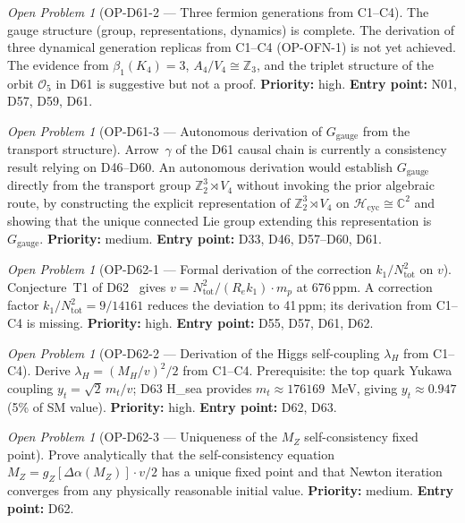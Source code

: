 \documentclass[11pt,a4paper]{article}
\theoremstyle{plain}
\theoremstyle{definition}
\theoremstyle{remark}
\newtheorem{openproblem}[theorem]{Open Problem}
\begin{document}
\begin{openproblem}[OP-D61-2 --- Three fermion generations from C1--C4]
\label{op:D61two}
The gauge structure (group, representations, dynamics) is complete. The derivation of three dynamical generation replicas from C1--C4 (OP-OFN-1) is not yet achieved. The evidence from $\beta_1(K_4) = 3$, $A_4/V_4 \cong \mathbb{Z}_3$, and the triplet structure of the orbit $\mathcal{O}_5$ in D61 is suggestive but not a proof. \textbf{Priority:} high. \textbf{Entry point:} N01, D57, D59, D61.
\end{openproblem}

\begin{openproblem}[OP-D61-3 --- Autonomous derivation of $G_\mathrm{gauge}$ from the transport structure]
\label{op:D61three}
Arrow~$\gamma$ of the D61 causal chain is currently a consistency result relying on D46--D60. An autonomous derivation would establish $G_\mathrm{gauge}$ directly from the transport group $\mathbb{Z}_2^3 \rtimes V_4$ without invoking the prior algebraic route, by constructing the explicit representation of $\mathbb{Z}_2^3 \rtimes V_4$ on $\mathcal{H}_\mathrm{cyc} \cong \mathbb{C}^2$ and showing that the unique connected Lie group extending this representation is $G_\mathrm{gauge}$. \textbf{Priority:} medium. \textbf{Entry point:} D33, D46, D57--D60, D61.
\end{openproblem}

\begin{openproblem}[OP-D62-1 --- Formal derivation of the correction $k_1/N_{\mathrm{tot}}^2$ on $v$]
\label{op:D62one}
Conjecture~T1 of D62~\cite{D62} gives $v = N_{\mathrm{tot}}^2/(R_e k_1)\cdot m_p$ at 676\,ppm. A correction factor $k_1/N_{\mathrm{tot}}^2 = 9/14161$ reduces the deviation to 41\,ppm; its derivation from C1--C4 is missing. \textbf{Priority:} high. \textbf{Entry point:} D55, D57, D61, D62.
\end{openproblem}

\begin{openproblem}[OP-D62-2 --- Derivation of the Higgs self-coupling $\lambda_H$ from C1--C4]
\label{op:D62two}
Derive $\lambda_H = (M_H/v)^2/2$ from C1--C4. Prerequisite: the top quark Yukawa coupling $y_t = \sqrt{2}\,m_t/v$; D63 H\_sea provides $m_t \approx 176169$~MeV, giving $y_t \approx 0.947$ (5\% of SM value). \textbf{Priority:} high. \textbf{Entry point:} D62, D63.
\end{openproblem}

\begin{openproblem}[OP-D62-3 --- Uniqueness of the $M_Z$ self-consistency fixed point]
\label{op:D62three}
Prove analytically that the self-consistency equation $M_Z = g_Z[\Delta\alpha(M_Z)]\cdot v/2$ has a unique fixed point and that Newton iteration converges from any physically reasonable initial value. \textbf{Priority:} medium. \textbf{Entry point:} D62.
\end{openproblem}
\end{document}
